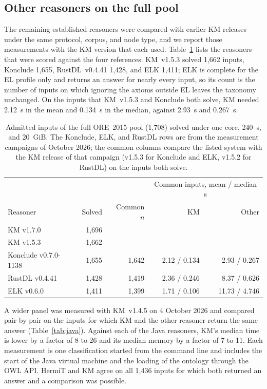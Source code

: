 \subsection{Other reasoners on the full pool}
\label{sec:eval-pool}

The remaining established reasoners were compared with earlier KM releases
under the same protocol, corpus, and node type, and we report those
measurements with the KM version that each used.  Table~\ref{tab:pool} lists
the reasoners that were scored against the four references.  KM~v1.5.3 solved
1,662 inputs, Konclude 1,655, RustDL~v0.4.41 1,428, and ELK 1,411; ELK is
complete for the EL profile only and returns an answer for nearly every input,
so its count is the number of inputs on which ignoring the axioms outside EL
leaves the taxonomy unchanged.  On the inputs that KM~v1.5.3 and Konclude both
solve, KM needed 2.12~s in the mean and 0.134~s in the median, against 2.93~s
and 0.267~s.

\begin{table}[t]
\centering
\small
\caption{Admitted inputs of the full ORE~2015 pool (1,708) solved under one
core, 240~s, and 20~GiB.  The Konclude, ELK, and RustDL rows are from the
measurement campaigns of October 2026; the common columns compare the listed
system with the KM release of that campaign (v1.5.3 for Konclude and ELK,
v1.5.2 for RustDL) on the inputs both solve.}
\label{tab:pool}
\begin{tabular}{lrrrr}
\toprule
 & & & \multicolumn{2}{c}{Common inputs, mean / median s} \\
Reasoner & Solved & Common $n$ & KM & Other \\
\midrule
KM v1.7.0 & 1,696 & & & \\
KM v1.5.3 & 1,662 & & & \\
Konclude v0.7.0-1138 & 1,655 & 1,642 & 2.12 / 0.134 & 2.93 / 0.267 \\
RustDL v0.4.41 & 1,428 & 1,419 & 2.36 / 0.246 & 8.37 / 0.626 \\
ELK v0.6.0 & 1,411 & 1,399 & 1.71 / 0.106 & 11.73 / 4.746 \\
\bottomrule
\end{tabular}
\end{table}

A wider panel was measured with KM~v1.4.5 on 4 October 2026 and compared pair
by pair on the inputs for which KM and the other reasoner return the same
answer (Table~\ref{tab:java}).  Against each of the Java reasoners, KM's
median time is lower by a factor of 8 to 26 and its median memory by a factor
of 7 to 11.  Each measurement is one classification started from the command line and
includes the start of the Java virtual machine and the loading of the ontology
through the OWL API.  HermiT and KM agree on all 1,436
inputs for which both returned an answer and a comparison was possible.

